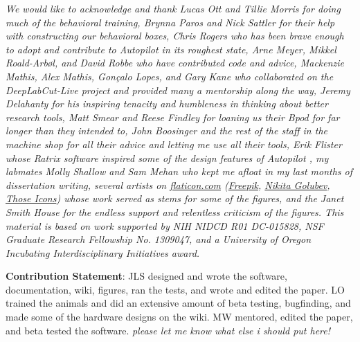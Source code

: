 
\begin{acknowledgements}
\textit{We would like to acknowledge and thank Lucas Ott and Tillie Morris for doing much of the behavioral training, Brynna Paros and Nick Sattler for their help with constructing our behavioral boxes, Chris Rogers who has been brave enough to adopt and contribute to Autopilot in its roughest state, Arne Meyer, Mikkel Roald-Arbøl, and David Robbe who have contributed code and advice, Mackenzie Mathis, Alex Mathis, Gonçalo Lopes, and Gary Kane who collaborated on the DeepLabCut-Live project and provided many a mentorship along the way, Jeremy Delahanty for his inspiring tenacity and humbleness in thinking about better research tools, Matt Smear and Reese Findley for loaning us their Bpod for far longer than they intended to, John Boosinger and the rest of the staff in the machine shop for all their advice and letting me use all their tools, Erik Flister whose Ratrix software inspired some of the design features of Autopilot \citep{meierCollinearFeaturesImpair2011}, my labmates Molly Shallow and Sam Mehan who kept me afloat in my last months of dissertation writing, several artists on \url{flaticon.com} (\href{https://www.flaticon.com/authors/freepik}{Freepik}, \href{https://www.flaticon.com/authors/nikita-golubev}{Nikita Golubev}, \href{https://www.flaticon.com/authors/those-icons}{Those Icons}) whose work served as stems for some of the figures, and the Janet Smith House for the endless support and relentless criticism of the figures. This material is based on work supported by NIH NIDCD R01 DC-015828, NSF Graduate Research Fellowship No. 1309047, and a University of Oregon Incubating Interdisciplinary Initiatives award.}

\textbf{Contribution Statement}: JLS designed and wrote the software, documentation, wiki, figures, ran the tests, and wrote and edited the paper. LO trained the animals and did an extensive amount of beta testing, bugfinding, and made some of the hardware designs on the wiki. MW mentored, edited the paper, and beta tested the software. \textit{please let me know what else i should put here!}

\end{acknowledgements}